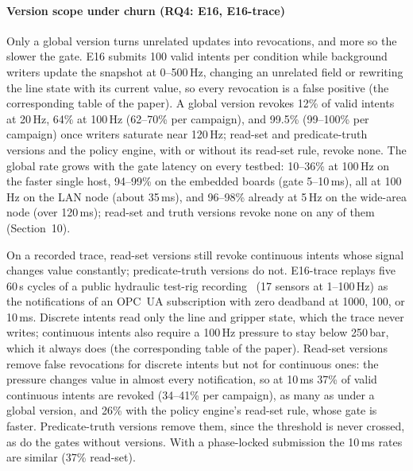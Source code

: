 \documentclass[11pt]{article}
\begin{document}
\paragraph{Version scope under churn (RQ4: E16, E16-trace)}
Only a global version turns unrelated updates into revocations, and more so the slower the gate. E16 submits 100 valid intents per condition while background writers update the snapshot at 0--500\,Hz, changing an unrelated field or rewriting the line state with its current value, so every revocation is a false positive (the corresponding table of the paper). A global version revokes 12\% of valid intents at 20\,Hz, 64\% at 100\,Hz (62--70\% per campaign), and 99.5\% (99--100\% per campaign) once writers saturate near 120\,Hz; read-set and predicate-truth versions and the policy engine, with or without its read-set rule, revoke none. The global rate grows with the gate latency on every testbed: 10--36\% at 100\,Hz on the faster single host, 94--99\% on the embedded boards (gate 5--10\,ms), all at 100\,Hz on the LAN node (about 35\,ms), and 96--98\% already at 5\,Hz on the wide-area node (over 120\,ms); read-set and truth versions revoke none on any of them (Section~10).

On a recorded trace, read-set versions still revoke continuous intents whose signal changes value constantly; predicate-truth versions do not. E16-trace replays five 60\,s cycles of a public hydraulic test-rig recording~ (17 sensors at 1--100\,Hz) as the notifications of an OPC~UA subscription with zero deadband at 1000, 100, or 10\,ms. Discrete intents read only the line and gripper state, which the trace never writes; continuous intents also require a 100\,Hz pressure to stay below 250\,bar, which it always does (the corresponding table of the paper). Read-set versions remove false revocations for discrete intents but not for continuous ones: the pressure changes value in almost every notification, so at 10\,ms 37\% of valid continuous intents are revoked (34--41\% per campaign), as many as under a global version, and 26\% with the policy engine's read-set rule, whose gate is faster. Predicate-truth versions remove them, since the threshold is never crossed, as do the gates without versions. With a phase-locked submission the 10\,ms rates are similar (37\% read-set).
\end{document}
